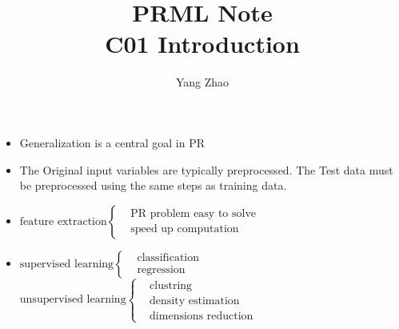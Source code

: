 \documentclass[12pt, a4paper]{article}
\title{PRML Note\\C01 Introduction}
\author{Yang Zhao}
\affil{Department of Automation, Tsinghua University}
\date{}
\begin{document}
    \maketitle
    \begin{itemize}
        \item Generalization is a central goal in PR
        \item The Original input variables are typically
        preprocessed. The Test data must be preprocessed
        using the same steps as training data.
        \item  $\text{feature extraction}
        \begin{cases}
        &\text{PR problem easy to solve}\\
        &\text{speed up computation}
        \end{cases}$
        \item  $\text{supervised learning}
        \begin{cases}
        &\text{classification}\\
        &\text{regression}
        \end{cases}$\\
        $\text{unsupervised learning}
        \begin{cases}
        &\text{clustring}\\
        &\text{density estimation}\\
        &\text{dimensions reduction}
        \end{cases}$
    \end{itemize}
\end{document}
